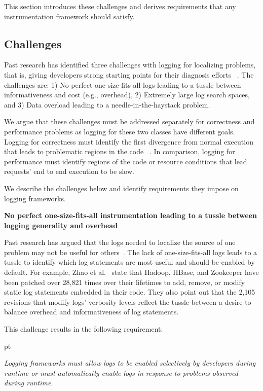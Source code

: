 This section introduces these challenges and derives requirements that any instrumentation framework should satisfy.

\subsection{Challenges}
Past research has identified three challenges with logging for localizing problems, that is, giving developers strong starting points for their diagnosis efforts ~\cite{Kiciman2005a}. 
The challenges are: 
1) No perfect one-size-fits-all logs leading to a tussle between informativeness and cost (e.g., overhead), 
2) Extremely large log search spaces, and
3) Data overload leading to a needle-in-the-haystack problem.

We argue that these challenges must be addressed
separately for correctness and performance problems as logging for these two classes have different goals.
Logging for correctness must identify the first divergence from normal execution that
leads to problematic regions in the code ~\cite{ArumugaNainar:2010fx,
Yuan:2012eh, Yuan:2010ww, Zuo:2016et}. 
In comparison, logging for performance must identify regions of the code or resource conditions that lead requests' end to end execution to be slow.

We describe the challenges below and identify requirements they impose
on logging frameworks.

\noindent\textbf{No perfect one-size-fits-all instrumentation leading to
  a tussle between logging generality and overhead} 
  
Past research has argued that the logs needed to localize the
source of one problem may not be useful for others~\cite{Mace:2015uh,
  Yuan:2012eh, Zhao:2017co, Vef:2018bx}.  
The lack of one-size-fits-all logs leads to a tussle to identify which
log statements are most useful and should be enabled by default.  For
example, Zhao et al.~\cite{Zhao:2017co} state that Hadoop, HBase, and
Zookeeper have been patched over 28,821 times over their lifetimes to
add, remove, or modify static log statements embedded in their code.
They also point out that the 2,105 revisions that modify logs'
verbosity levels reflect the tussle between a desire to balance
overhead and informativeness of log statements.

This challenge results in the following requirement: 
\begin{description}%
     pt
  \item[\textit{R1}] \textit{Logging frameworks must allow logs to be
    enabled selectively by developers during runtime or must
    automatically enable logs in response to problems observed during runtime.}
  \end{description}



